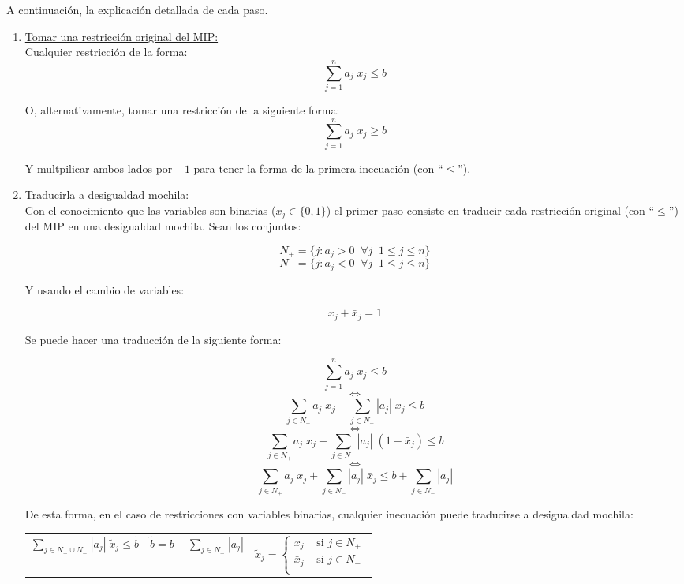 A continuación, la explicación detallada de cada paso.
\newpage

\begin{enumerate}
\item \underline{Tomar una restricción original del MIP:}\\
Cualquier restricción de la forma:
$$\overset{n}{\underset{j=1}{\sum}} a_j\;x_j \leq b$$

O, alternativamente, tomar una restricción de la siguiente forma:
$$\overset{n}{\underset{j=1}{\sum}} a_j\;x_j \geq b$$

Y multpilicar ambos lados por $-1$ para tener la forma de la primera inecuación (con ``$\leq$'').

\item \underline{Traducirla a desigualdad mochila:}\\
Con el conocimiento que las variables son binarias ($x_j\in\{0,1\}$) el primer paso consiste en traducir cada restricción original (con ``$\leq$'') del MIP en una desigualdad mochila. Sean los conjuntos:

$$N_+ = \{j: a_j > 0 \;\;\forall j\;\; 1\leq j \leq n\}$$
$$N_- = \{j: a_j < 0 \;\;\forall j\;\; 1\leq j \leq n\}$$

Y usando el cambio de variables:

$$x_j + \bar{x}_j = 1$$

Se puede hacer una traducción de la siguiente forma:

$$\overset{n}{\underset{j=1}{\sum}} a_j\;x_j \leq b$$
$$\Leftrightarrow$$
$$\overset{}{\underset{j \in N_+}{\sum}} a_j\;x_j - \overset{}{\underset{j \in N_-}{\sum}} |a_j|\;x_j \leq b$$
$$\Leftrightarrow$$
$$\overset{}{\underset{j \in N_+}{\sum}} a_j\;x_j - \overset{}{\underset{j \in N_-}{\sum}} |a_j|\;(1-\bar{x}_j) \leq b$$
$$\Leftrightarrow$$
$$\overset{}{\underset{j \in N_+}{\sum}} a_j\;x_j + \overset{}{\underset{j \in N_-}{\sum}} |a_j|\;\bar{x}_j \leq b + \overset{}{\underset{j \in N_-}{\sum}} |a_j|$$

De esta forma, en el caso de restricciones con variables binarias, cualquier inecuación puede traducirse a desigualdad mochila:

{
\centering
\begin{tabular}{p{4cm}p{4cm}p{4cm}}
$\overset{}{\underset{j \in N_+ \cup N_-}{\sum}} |a_j|\;\tilde{x}_j \leq \tilde{b}$
&
$\tilde{b} = b + \overset{}{\underset{j \in N_-}{\sum}} |a_j|$
&
$\tilde{x}_j = 
\begin{cases}
x_j & \text{ si } j \in N_+\\
\bar{x}_j & \text{ si } j \in N_-\\
\end{cases}$\\
\end{tabular}\\
\vspace{5mm}
}


\end{enumerate}
